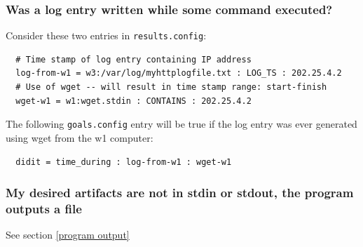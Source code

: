 \documentclass[12pt]{article}
\begin{document}
\subsubsection{Was a log entry written while some command executed?}
Consider these two entries in {\tt results.config}:
\begin{verbatim}
  # Time stamp of log entry containing IP address
  log-from-w1 = w3:/var/log/myhttplogfile.txt : LOG_TS : 202.25.4.2
  # Use of wget -- will result in time stamp range: start-finish
  wget-w1 = w1:wget.stdin : CONTAINS : 202.25.4.2
\end{verbatim}
\noindent The following {\tt goals.config} entry will be true if the log entry was 
ever generated using wget from the w1 computer:
\begin{verbatim}
  didit = time_during : log-from-w1 : wget-w1 
\end{verbatim}


\subsubsection{My desired artifacts are not in stdin or stdout, the program outputs a file}
See section \ref{program output}
\end{document}
